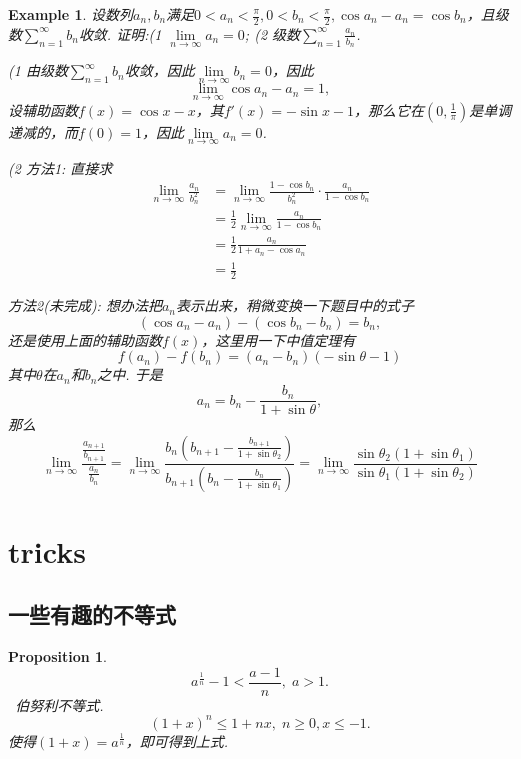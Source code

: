 \documentclass{article}
\newtheorem{proposition}[theorem]{Proposition}
\newtheorem{example}[theorem]{Example}
\newcommand{\hints}{{\color{blue} \text{hints}}}
\begin{document}
\begin{example}
\rm 设数列${a_n},{b_n}$满足$0 < a_n < \frac{\pi}{2}, 0 < b_n < \frac{\pi}{2}, \cos a_n - a_n = \cos b_n$，且级数$\sum\limits_{n=1}^{\infty}b_n$收敛. 证明:(1 $\lim\limits_{n \to \infty} a_n = 0$; (2 级数$\sum\limits_{n=1}^{\infty} \frac{a_n}{b_n}$. 

\hints (1 由级数$\sum\limits_{n=1}^{\infty}b_n$收敛，因此$\lim\limits_{n \to \infty} b_n = 0$，因此
$$
\lim\limits_{n \to \infty} \cos a_n-a_n = 1,
$$
设辅助函数$f(x) = \cos x-x$，其$f'(x) = -\sin x - 1$，那么它在$(0,\frac{1}{\pi})$是单调递减的，而$f(0) = 1$，因此$\lim\limits_{n \to \infty} a_n = 0$. 

(2 方法1: 直接求
$$
\begin{aligned}
\lim\limits_{n \to \infty} \frac{a_n}{b_n^2} &= \lim\limits_{n \to \infty} \frac{1-\cos b_n}{b_n^2} \cdot \frac{a_n}{1-\cos b_n} \\
&= \frac{1}{2} \lim\limits_{n \to \infty}  \frac{a_n}{1-\cos b_n} \\
&= \frac{1}{2} \frac{a_n}{1+a_n - \cos a_n} \\
&= \frac{1}{2}
\end{aligned}
$$


方法2(未完成): 想办法把$a_n$表示出来，稍微变换一下题目中的式子
$$
(\cos a_n-a_n) -(\cos b_n-b_n) = b_n, 
$$
还是使用上面的辅助函数$f(x)$，这里用一下中值定理有
$$
f(a_n)-f(b_n)=(a_n-b_n)(-\sin \theta - 1)
$$
其中$\theta$在$a_n$和$b_n$之中. 于是
$$
a_n = b_n - \frac{b_n}{1+\sin \theta},
$$
那么
$$
\lim\limits_{n \to \infty} \frac{\frac{a_{n+1}}{b_{n+1}}}{\frac{a_{n}}{b_{n}}} = \lim\limits_{n \to \infty} \frac{b_n(b_{n+1} - \frac{b_{n+1}}{1+\sin \theta_2})}{b_{n+1}(b_{n} - \frac{b_{n}}{1+\sin \theta_1})} = \lim\limits_{n \to \infty} \frac{\sin \theta_2(1+\sin\theta_1)}{\sin \theta_1(1+\sin\theta_2)}
$$
\end{example}

\newpage
\section{tricks}

\subsection{一些有趣的不等式}

\begin{proposition}\label{prop: bonuli}
$$
a^{\frac{1}{n}}-1 < \frac{a-1}{n},\; a > 1.
$$
\hints\ {\color{red}伯努利不等式}.
$$
(1+x)^n \leq 1 + nx, \; n \geq 0, x \leq -1.
$$
使得$(1+x) = a^{\frac{1}{n}}$，即可得到上式.
\end{proposition}
\end{document}
